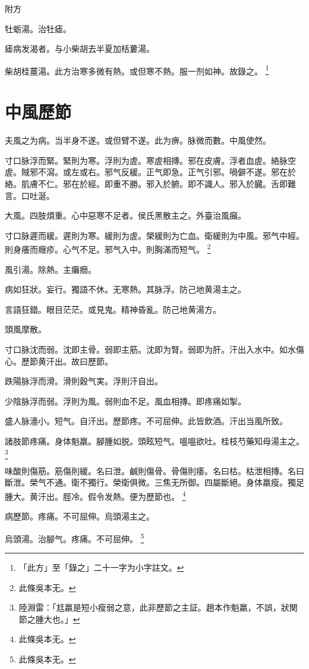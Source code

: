 附方

牡蛎湯。治牡瘧。

瘧病发渴者。与小柴胡去半夏加栝蔞湯。

柴胡桂薑湯。此方治寒多微有熱。或但寒不熱。服一剂如神。故錄之。
	\footnote{「此方」至「錄之」二十一字为小字註文。}

\chapter{中風歷節}

夫風之为病。当半身不遂。或但臂不遂。此为痹。脉微而數。中風使然。

寸口脉浮而緊。緊則为寒。浮則为虗。寒虗相摶。邪在皮膚。浮者血虗。絡脉空虗。賊邪不瀉。或左或右。邪气反緩。正气即急。正气引邪。喎僻不遂。邪在於絡。肌膚不仁。邪在於經。即重不勝。邪入於腑。即不識人。邪入於臓。舌即難言。口吐涎。

大風。四肢煩重。心中惡寒不足者。侯氏黑散主之。{\scriptsize 外臺治風癲。}

寸口脉遲而緩。遲則为寒。緩則为虗。榮緩則为亡血。衛緩則为中風。邪气中經。則身癢而癮疹。心气不足。邪气入中。則胸滿而短气。
	\footnote{此條吳本无。}

風引湯。除熱。主癱癇。

病如狂狀。妄行。獨語不休。无寒熱。其脉浮。防己地黄湯主之。

言語狂錯。眼目茫茫。或見鬼。精神昏亂。防己地黄湯方。{\qianjin}

頭風摩散。

寸口脉沈而弱。沈即主骨。弱即主筋。沈即为腎。弱即为肝。汗出入水中。如水傷心。歷節黄汗出。故曰歷節。

跌陽脉浮而滑。滑則穀气実。浮則汗自出。

少陰脉浮而弱。浮則为風。弱則血不足。風血相摶。即疼痛如掣。

盛人脉濇小。短气。自汗出。歷節疼。不可屈伸。此皆飲酒。汗出当風所致。

諸肢節疼痛。身体魁羸。腳腫如脱。頭眩短气。嗢嗢欲吐。桂枝芍藥知母湯主之。
	\footnote{陸淵雷：「尪羸是短小瘦弱之意，此非歷節之主証。趙本作魁羸，不誤，狀関節之腫大也。」}

味酸則傷筋。筋傷則緩。名曰泄。鹹則傷骨。骨傷則痿。名曰枯。枯泄相摶。名曰斷泄。榮气不通。衛不獨行。榮衛俱微。三焦无所御。四屬斷絕。身体羸瘦。獨足腫大。黄汗出。脛冷。假令发熱。便为歷節也。
	\footnote{此條吳本无。}

病歷節。疼痛。不可屈伸。烏頭湯主之。

烏頭湯。治腳气。疼痛。不可屈伸。
	\footnote{此條吳本无。}

